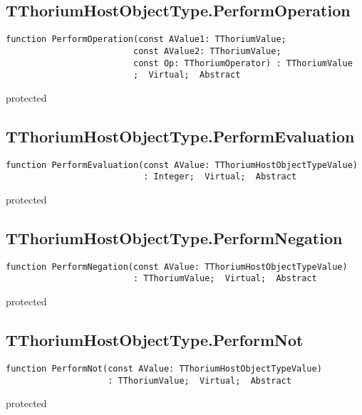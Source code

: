 \subsection{TThoriumHostObjectType.PerformOperation}
\label{thoriumcore:thorium:tthoriumhostobjecttype:performoperation}
\begin{FPCList}
\Synopsis
\Declaration 

\begin{verbatim}
function PerformOperation(const AValue1: TThoriumValue;
                         const AValue2: TThoriumValue;
                         const Op: TThoriumOperator) : TThoriumValue
                         ;  Virtual;  Abstract
\end{verbatim}
\Visibility
protected
\Description
\Errors
\end{FPCList}
\subsection{TThoriumHostObjectType.PerformEvaluation}
\label{thoriumcore:thorium:tthoriumhostobjecttype:performevaluation}
\begin{FPCList}
\Synopsis
\Declaration 

\begin{verbatim}
function PerformEvaluation(const AValue: TThoriumHostObjectTypeValue)
                           : Integer;  Virtual;  Abstract
\end{verbatim}
\Visibility
protected
\Description
\Errors
\end{FPCList}
\subsection{TThoriumHostObjectType.PerformNegation}
\label{thoriumcore:thorium:tthoriumhostobjecttype:performnegation}
\begin{FPCList}
\Synopsis
\Declaration 

\begin{verbatim}
function PerformNegation(const AValue: TThoriumHostObjectTypeValue)
                         : TThoriumValue;  Virtual;  Abstract
\end{verbatim}
\Visibility
protected
\Description
\Errors
\end{FPCList}
\subsection{TThoriumHostObjectType.PerformNot}
\label{thoriumcore:thorium:tthoriumhostobjecttype:performnot}
\begin{FPCList}
\Synopsis
\Declaration 

\begin{verbatim}
function PerformNot(const AValue: TThoriumHostObjectTypeValue)
                    : TThoriumValue;  Virtual;  Abstract
\end{verbatim}
\Visibility
protected
\Description
\Errors
\end{FPCList}
